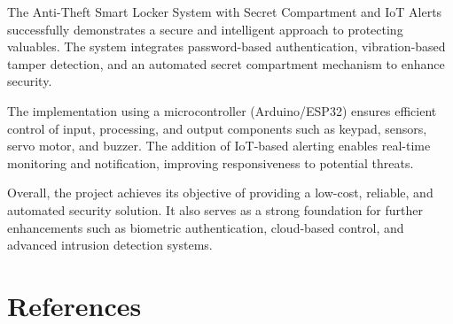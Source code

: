\documentclass[conference]{IEEEtran}
\begin{document}
The Anti-Theft Smart Locker System with Secret Compartment and IoT Alerts successfully demonstrates a secure and intelligent approach to protecting valuables. The system integrates password-based authentication, vibration-based tamper detection, and an automated secret compartment mechanism to enhance security.

The implementation using a microcontroller (Arduino/ESP32) ensures efficient control of input, processing, and output components such as keypad, sensors, servo motor, and buzzer. The addition of IoT-based alerting enables real-time monitoring and notification, improving responsiveness to potential threats.

Overall, the project achieves its objective of providing a low-cost, reliable, and automated security solution. It also serves as a strong foundation for further enhancements such as biometric authentication, cloud-based control, and advanced intrusion detection systems.

\section{References}
\end{document}
